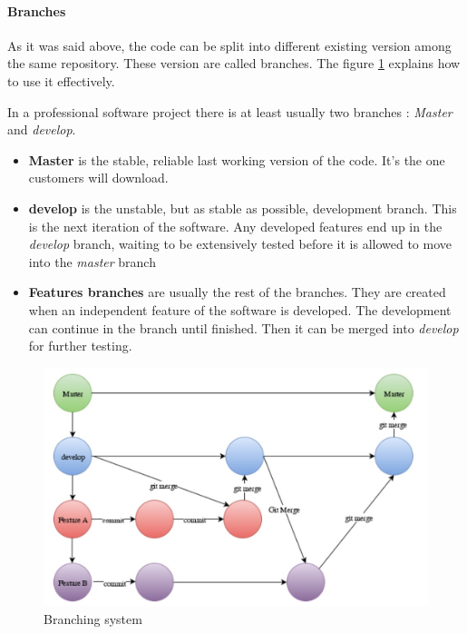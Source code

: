 \documentclass[a4paper]{report}
\begin{document}
\paragraph{Branches}

As it was said above, the code can be split into different existing version among the same repository. These version are called branches. The figure \ref{fig:gitbranch_logo} explains how to use it effectively. 

In a professional software project there is at least usually two branches : \textit{Master} and \textit{develop}. 
\begin{itemize}
	\item \textbf{Master} is the stable, reliable last working version of the code. It's the one customers will download.
    \item \textbf{develop} is the unstable, but as stable as possible, development branch. This is the next iteration of the software. Any developed features end up in the \textit{develop} branch, waiting to be extensively tested before it is allowed to move into the \textit{master} branch
    \item \textbf{Features branches} are usually the rest of the branches. They are created when an independent feature of the software is developed. The development can continue in the branch until finished. Then it can be merged into \textit{develop} for further testing.
\end{itemize}

\begin{figure}[H]
	\centering
	\includegraphics[width=1\linewidth]{image/GitBranch.jpg}
	\caption{Branching system}
	\label{fig:gitbranch_logo}
\end{figure}
\end{document}
